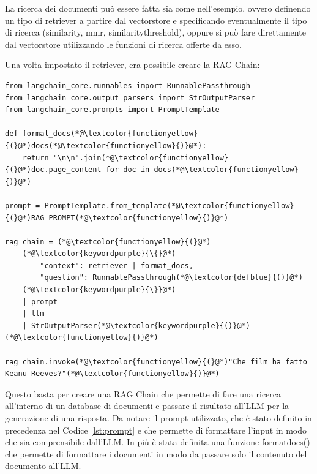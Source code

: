La ricerca dei documenti può essere fatta sia come nell'esempio, ovvero definendo un tipo di retriever a partire dal vectorstore e specificando eventualmente il tipo di ricerca (similarity, mmr, similarity\textunderscore threshold), oppure si può fare direttamente dal vectorstore utilizzando le funzioni di ricerca offerte da esso.

Una volta impostato il retriever, era possibile creare la RAG Chain:
\begin{lstlisting}[label=lst:ragchain, caption={Creazione della RAG Chain}]
from langchain_core.runnables import RunnablePassthrough
from langchain_core.output_parsers import StrOutputParser
from langchain_core.prompts import PromptTemplate

def format_docs(*@\textcolor{functionyellow}{(}@*)docs(*@\textcolor{functionyellow}{)}@*):
    return "\n\n".join(*@\textcolor{functionyellow}{(}@*)doc.page_content for doc in docs(*@\textcolor{functionyellow}{)}@*)

prompt = PromptTemplate.from_template(*@\textcolor{functionyellow}{(}@*)RAG_PROMPT(*@\textcolor{functionyellow}{)}@*)

rag_chain = (*@\textcolor{functionyellow}{(}@*)
    (*@\textcolor{keywordpurple}{\{}@*)
        "context": retriever | format_docs,
        "question": RunnablePassthrough(*@\textcolor{defblue}{()}@*)
    (*@\textcolor{keywordpurple}{\}}@*)
    | prompt
    | llm
    | StrOutputParser(*@\textcolor{keywordpurple}{()}@*)
(*@\textcolor{functionyellow}{)}@*)

rag_chain.invoke(*@\textcolor{functionyellow}{(}@*)"Che film ha fatto Keanu Reeves?"(*@\textcolor{functionyellow}{)}@*)
\end{lstlisting}
Questo basta per creare una RAG Chain che permette di fare una ricerca all'interno di un database di documenti e passare il risultato all'LLM per la generazione di una risposta. Da notare il prompt utilizzato, che è stato definito in precedenza nel Codice \ref{lst:prompt} e che permette di formattare l'input in modo che sia comprensibile dall'LLM. In più è stata definita una funzione format\textunderscore docs() che permette di formattare i documenti in modo da passare solo il contenuto del documento all'LLM.


